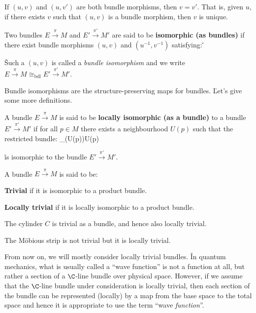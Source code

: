If $(u,v)$ and $(u,v')$ are both bundle morphisms, then $v=v'$. That is, given $u$, if there exists $v$ such that $
(u,v)$ is a bundle morphism, then $v$ is unique.

Two bundles $E\xrightarrow{\,\pi\,}M$ and $E'\xrightarrow{\,\pi'\,}M'$ are said to be \textbf{isomorphic (as bundles)}
if there exist bundle morphisms $(u,v)$ and $(u^{-1},v^{-1})$ satisfying: \v
\bse
{}
\ese

\v

Such a $(u,v)$ is called a \emph{bundle isomorphism} and we write
$E\xrightarrow{\, \pi\,}M \cong_{\mathrm{bdl}} E'\xrightarrow{\,\pi'\,}M'$.
\ed

Bundle isomorphisms are the structure-preserving maps for bundles. \v

Let's give some more definitions.

A bundle $E\xrightarrow{\,\pi\,}M$ is said to be \textbf{locally isomorphic (as a bundle)} to a bundle
$E'\xrightarrow{\,\pi'\,}M'$ if for all $p\in M$ there exists a neighbourhood $U(p)$ such that the restricted bundle:
\bse
{}_\pi(U(p))U(p)
\ese

\v

is isomorphic to the bundle $E'\xrightarrow{\,\pi'\,}M'$.
\ed

A bundle $E\xrightarrow{\,\pi\,}M$ is said to be:
\ben
\item[i)] \textbf{Trivial} if it is isomorphic to a product bundle.
\item[ii)] \textbf{Locally trivial} if it is locally isomorphic to a product bundle.
\een
\ed

\be
The cylinder $C$ is trivial as a bundle, and hence also locally trivial.
\ee

\be
The Möbious strip is not trivial but it is locally trivial.
\ee

From now on, we will mostly consider locally trivial bundles. \v

In quantum mechanics, what is usually called a ``wave function'' is not a function at all, but rather a section of a
$\C$-line bundle over physical space. However, if we assume that the $\C$-line bundle under consideration is locally
trivial, then each section of the bundle can be represented (locally) by a map from the base space to the total space
and hence it is appropriate to use the term ``wave \emph{function}''.

